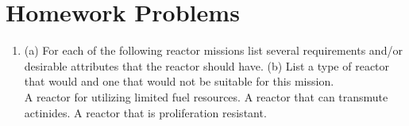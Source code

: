 \documentclass[]{article}
\begin{document}
\section{Homework Problems}
\begin{enumerate}
\item (a) For each of the following reactor missions list several requirements and/or desirable attributes that the reactor should have. (b) List a type of reactor that would and one that would not be suitable for this mission.\\
A reactor for utilizing limited fuel resources. A reactor that can transmute actinides. A reactor that is proliferation resistant. 

\end{enumerate}
\end{document}

